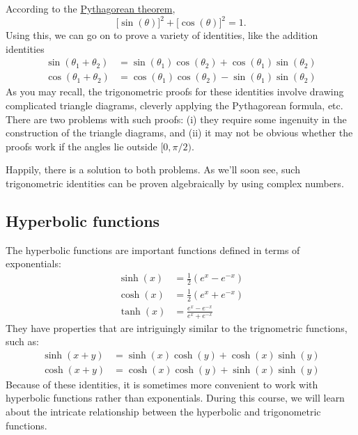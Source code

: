 \documentclass[10pt,a4paper]{article}
\begin{document}
According to the
\href{http://www.faculty.umb.edu/gary_zabel/Courses/Phil\%20281b/Philosophy\%20of\%20Magic/Arcana/Neoplatonism/Pythagoras/index.shtml.html}{Pythagorean
theorem},
\begin{equation}
  \big[\sin(\theta)\big]^2 + \big[\cos(\theta)\big]^2 = 1.
\end{equation}
Using this, we can go on to prove a variety of identities, like the
addition identities
\begin{align}
  \sin(\theta_1 + \theta_2) &= \sin(\theta_1) \cos(\theta_2) + \cos(\theta_1)\sin(\theta_2) \\
  \cos(\theta_1 + \theta_2) &= \cos(\theta_1) \cos(\theta_2) - \sin(\theta_1)\sin(\theta_2)
\end{align}
As you may recall, the trigonometric proofs for these identities
involve drawing complicated triangle diagrams, cleverly applying the
Pythagorean formula, etc. There are two problems with such proofs: (i)
they require some ingenuity in the construction of the triangle
diagrams, and (ii) it may not be obvious whether the proofs work if
the angles lie outside $[0,\pi/2)$.

Happily, there is a solution to both problems. As we'll soon see, such
trigonometric identities can be proven algebraically by using complex
numbers.

\subsection{Hyperbolic functions}\label{hyperbolic-functions}

The hyperbolic functions are important functions defined in terms of
exponentials:
\begin{align}
  \sinh(x) &= \frac{1}{2}\left(e^{x} - e^{-x}\right) \\
  \cosh(x) &= \frac{1}{2}\left(e^{x} + e^{-x}\right) \\
  \tanh(x) &= \frac{e^{x} - e^{-x}}{e^{x} + e^{-x}}
\end{align}
They have properties that are intriguingly similar to the trignometric
functions, such as:
\begin{align}
  \sinh(x+y) &= \sinh(x)\cosh(y) + \cosh(x)\sinh(y) \\
  \cosh(x+y) &= \cosh(x)\cosh(y) + \sinh(x)\sinh(y)
\end{align}
Because of these identities, it is sometimes more convenient to work
with hyperbolic functions rather than exponentials. During this course,
we will learn about the intricate relationship between the hyperbolic
and trigonometric functions.
\end{document}
